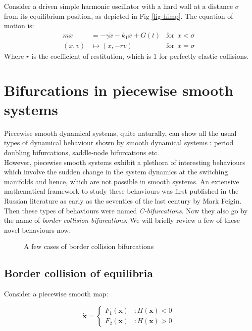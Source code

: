 \documentclass{book}
\renewcommand{\(}{\begin{columns}}
\renewcommand{\)}{\end{columns}}
\newcommand{\<}[1]{\begin{column}{#1}}
\renewcommand{\>}{\end{column}}
\begin{document}
Consider a driven simple harmonic oscillator with a hard wall at a distance 
$\sigma$ from its equilibrium position, as depicted in Fig \ref{fig-himp}.   The equation of motion is:
\begin{align}
\label{eq-hard_impact}
m\ddot{x}&=-\gamma \dot{x}-k_1x+G(t)&\mathrm{for}~~x<\sigma\\
(x,v)&\mapsto (x,-rv)&\mathrm{for}~~x=\sigma
\end{align}
Where $r$ is the coefficient of restitution, which is $1$ for perfectly 
elastic collisions.  


\section{Bifurcations in piecewise smooth systems}
Piecewise smooth dynamical systems, quite naturally, can show all the usual 
types of dynamical behaviour shown by smooth dynamical systems : period 
doubling\cite[p.~166-170]{hilborn-chaos} bifurcations, 
saddle-node\cite[p.~109]{hilborn-chaos} bifurcations etc.  \\

However,  piecewise smooth systems exhibit a plethora of interesting behaviours
which involve the sudden change in the system dynamics at the switching 
manifolds and hence, which are not possible in smooth systems. An extensive mathematical 
framework to study these behaviours was first published in the Russian 
literature as early as the seventies of the last century by Mark Feigin\cite{feigin-1970}.
Then these types of behaviours were named \emph{C-bifurcations}.  Now they also go by 
the name of \emph{border collision bifurcations}. We will briefly review a few 
of these novel  behaviours now.   



\begin{figure}[!htp]
\centering
\caption{A few cases of border collision bifurcations}
\def\svgwidth{0.9\columnwidth}

\end{figure}


\subsection{Border collision of equilibria}
Consider a piecewise smooth map:

\begin{equation}
\label{ex-pwflow}
   \dot{\mathbf{x}} = \left\{
     \begin{array}{lr}
       F_1(\mathbf{x}) & : H(\mathbf{x})<0\\
       F_2(\mathbf{x}) & : H(\mathbf{x})>0
     \end{array}
   \right.
\end{equation}
\end{document}
